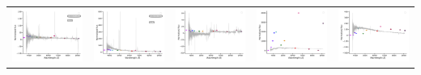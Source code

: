 \begin{center}
\begin{longtable}{l l l l l }
    \includegraphics[width=0.19\linewidth, clip]{Figs/Figs-lamost/spec-55920-F5592001_sp09-232-STRIPE82-0031-003242.pdf} & \includegraphics[width=0.19\linewidth, clip]{Figs/Figs-lamost/spec-55920-F5592001_sp15-046-STRIPE82-0030-004872.pdf} & \includegraphics[width=0.19\linewidth, clip]{Figs/Figs-lamost/spec-55920-F5592001_sp16-128-STRIPE82-0030-034826.pdf} & \includegraphics[width=0.19\linewidth, clip]{Figs/Figs-lamost/spec-55973-F5597306_sp14-196-SPLUS-n02s22-039680.pdf} & \includegraphics[width=0.19\linewidth, clip]{Figs/Figs-lamost/spec-55973-F5597306_sp15-212-SPLUS-n01s23-035079.pdf} \\

\end{longtable}
\end{center}

